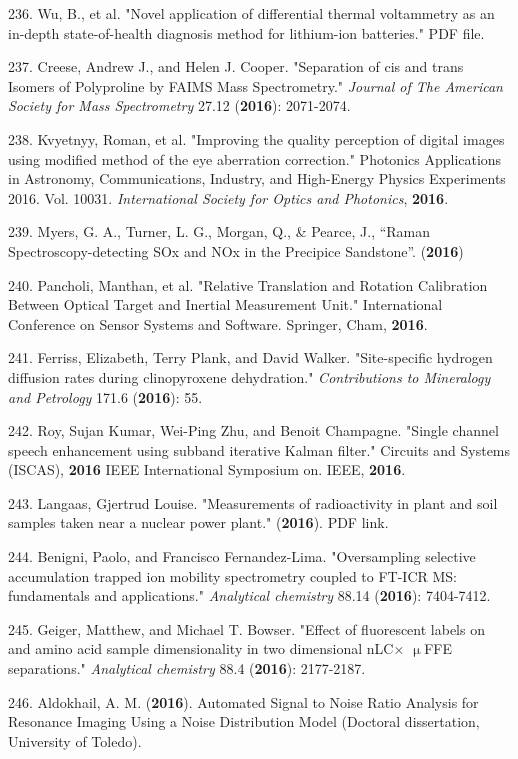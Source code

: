 236. Wu, B., et al. "Novel application of differential thermal voltammetry as an in-depth state-of-health diagnosis method for lithium-ion batteries." PDF file.

237. Creese, Andrew J., and Helen J. Cooper. "Separation of cis and trans Isomers of Polyproline by FAIMS Mass Spectrometry." \textit{Journal of The American Society for Mass Spectrometry} 27.12 (\textbf{2016}): 2071-2074.

238. Kvyetnyy, Roman, et al. "Improving the quality perception of digital images using modified method of the eye aberration correction." Photonics Applications in Astronomy, Communications, Industry, and High-Energy Physics Experiments 2016. Vol. 10031. \textit{International Society for Optics and Photonics}, \textbf{2016}.

239. Myers, G. A., Turner, L. G., Morgan, Q., \& Pearce, J., ``Raman Spectroscopy-detecting SOx and NOx in the Precipice Sandstone''. (\textbf{2016})

240. Pancholi, Manthan, et al. "Relative Translation and Rotation Calibration Between Optical Target and Inertial Measurement Unit." International Conference on Sensor Systems and Software. Springer, Cham, \textbf{2016}.

241. Ferriss, Elizabeth, Terry Plank, and David Walker. "Site-specific hydrogen diffusion rates during clinopyroxene dehydration." \textit{Contributions to Mineralogy and Petrology} 171.6 (\textbf{2016}): 55.

242. Roy, Sujan Kumar, Wei-Ping Zhu, and Benoit Champagne. "Single channel speech enhancement using subband iterative Kalman filter." Circuits and Systems (ISCAS), \textbf{2016} IEEE International Symposium on. IEEE, \textbf{2016}.

243. Langaas, Gjertrud Louise. "Measurements of radioactivity in plant and soil samples taken near a nuclear power plant." (\textbf{2016}). PDF link.

244. Benigni, Paolo, and Francisco Fernandez-Lima. "Oversampling selective accumulation trapped ion mobility spectrometry coupled to FT-ICR MS: fundamentals and applications." \textit{Analytical chemistry} 88.14 (\textbf{2016}): 7404-7412.

245. Geiger, Matthew, and Michael T. Bowser. "Effect of fluorescent labels on and amino acid sample dimensionality in two dimensional nLC${\times}$ ${\upmu}$FFE separations." \textit{Analytical chemistry} 88.4 (\textbf{2016}): 2177-2187.

246. Aldokhail, A. M. (\textbf{2016}). Automated Signal to Noise Ratio Analysis for Resonance Imaging Using a Noise Distribution Model (Doctoral dissertation, University of Toledo).

